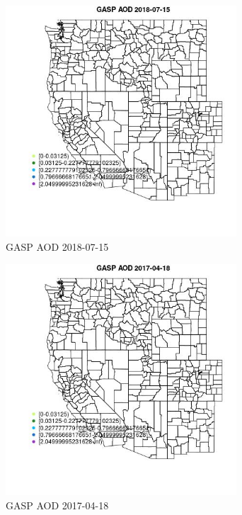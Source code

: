 \begin{figure} 
\centering  
\includegraphics[width=0.77\textwidth]{Code_Outputs/Report_ML_input_PM25_Step4_part_e_de_duplicated_aveswNAs_MapObsGASP_AOD2018-07-15.jpg} 
\caption{\label{fig:Report_ML_input_PM25_Step4_part_e_de_duplicated_aveswNAsMapObsGASP_AOD2018-07-15}GASP AOD 2018-07-15} 
\end{figure} 
 

\begin{figure} 
\centering  
\includegraphics[width=0.77\textwidth]{Code_Outputs/Report_ML_input_PM25_Step4_part_e_de_duplicated_aveswNAs_MapObsGASP_AOD2017-04-18.jpg} 
\caption{\label{fig:Report_ML_input_PM25_Step4_part_e_de_duplicated_aveswNAsMapObsGASP_AOD2017-04-18}GASP AOD 2017-04-18} 
\end{figure} 
 

